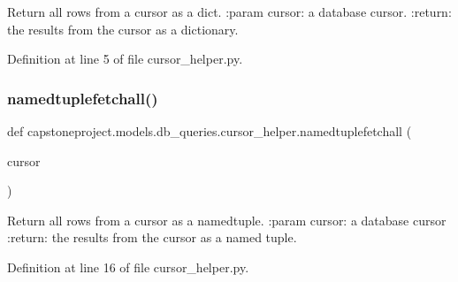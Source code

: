 \begin{DoxyVerb}Return all rows from a cursor as a dict.
:param cursor: a database cursor.
:return: the results from the cursor as a dictionary.
\end{DoxyVerb}
 

Definition at line 5 of file cursor\+\_\+helper.\+py.

\mbox{\label{namespacecapstoneproject_1_1models_1_1db__queries_1_1cursor__helper_ad8d9e0fa73723ae2c0894800f231438e}} 
\subsubsection{\texorpdfstring{namedtuplefetchall()}{namedtuplefetchall()}}
{\footnotesize\ttfamily def capstoneproject.\+models.\+db\+\_\+queries.\+cursor\+\_\+helper.\+namedtuplefetchall (\begin{DoxyParamCaption}\item[{}]{cursor }\end{DoxyParamCaption})}

\begin{DoxyVerb}Return all rows from a cursor as a namedtuple.
:param cursor: a database cursor
:return: the results from the cursor as a named tuple.
\end{DoxyVerb}
 

Definition at line 16 of file cursor\+\_\+helper.\+py.

